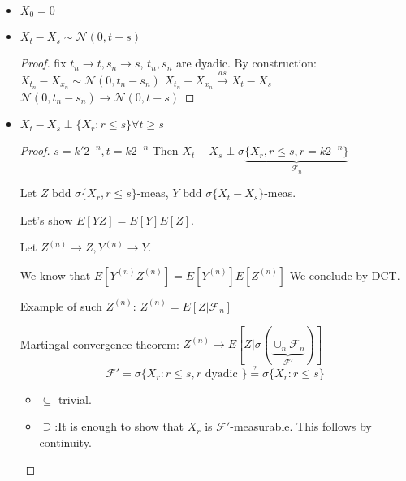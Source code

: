 \documentclass{article}
\begin{document}
\begin{itemize}
\item $X_0 = 0$
\item $X_t - X_s \sim \mathcal N(0, t-s)$
  \begin{proof}
    fix $t_n \rightarrow t, s_n \rightarrow s$, $t_n, s_n$ are dyadic.
    By construction: $X_{t_n} - X_{x_n} \sim \mathcal N(0, t_n - s_n)$
    $X_{t_n} - X_{x_n} \overset{as}{\rightarrow} X_t - X_s$
    $\mathcal N(0, t_n - s_n) \rightarrow \mathcal N(0, t - s)$
  \end{proof}
\item $X_t - X_s \perp \{ X_r : r \le s \} \forall t \ge s$
  \begin{proof}
    $s = k'2^{-n}, t = k2^{-n}$
    Then $X_t - X_s \perp \sigma \underbrace{\{ X_r, r \le s, r = k2^{-n}\}}_{\mathcal F_n}$
    
    Let $Z \text{ bdd } \sigma\{X_r, r \le s\}$-meas, 
    $Y \text{ bdd } \sigma\{X_t - X_s\}$-meas.

    Let's show $E[YZ] = E[Y]E[Z]$.

    Let $Z^{(n)} \rightarrow Z, Y^{(n)} \rightarrow Y$.
    
    We know that $E[Y^{(n)}Z^{(n)}] = E[Y^{(n)}]E[Z^{(n)}]$
    We conclude by DCT.

    Example of such $Z^{(n)}$:
    $Z^{(n)} = E[Z | \mathcal F_n]$

    Martingal convergence theorem: $Z^{(n)} \rightarrow E[Z | \sigma(\underbrace{\cup_n \mathcal F_n}_{\mathcal F'})]$
    $$\mathcal F' = \sigma \{ X_r : r \le s , r \text{ dyadic } \} \overset{?}{=} \sigma \{ X_r : r \le s \} $$
    \begin{itemize}
    \item $\subseteq$ trivial.
    \item $\supseteq$:It is enough to show that $X_r$ is $\mathcal F'$-measurable.
      This follows by continuity.
    \end{itemize}
    
  \end{proof}
\end{itemize}
\end{document}
